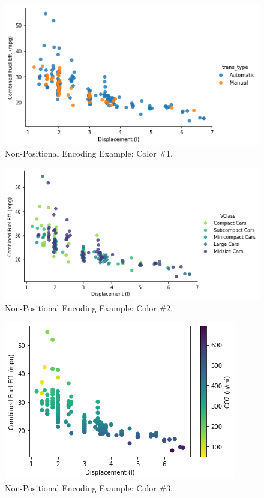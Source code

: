 \begin{figure}
	\includegraphics[width=\textwidth,height=\textheight,keepaspectratio]{images/figure31.png}
	\caption{Non-Positional Encoding Example: Color \#1.}\label{fig:figure31}
\end{figure}

\begin{figure}
	\includegraphics[width=\textwidth,height=\textheight,keepaspectratio]{images/figure32.png}
	\caption{Non-Positional Encoding Example: Color \#2.}\label{fig:figure32}
\end{figure}

\begin{figure}
	\includegraphics{images/figure33.png}
	\caption{Non-Positional Encoding Example: Color \#3.}\label{fig:figure33}
\end{figure}

